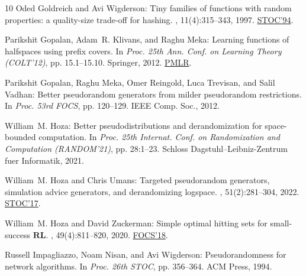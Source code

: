 \begin{thebibliography}{10}
{\sc Oded Goldreich and Avi Wigderson}: Tiny families of functions with random
  properties: a quality-size trade-off for hashing.
, 11(4):315--343, 1997.
\newblock \prelim \href{https://doi.org/10.1145/195058.195410}{STOC'94}.

{\sc Parikshit Gopalan, Adam~R. Klivans, and Raghu Meka}: Learning functions of
  halfspaces using prefix covers.
\newblock In {\em Proc. 25th Ann. Conf. on Learning Theory (COLT'12)}, pp.
  15.1--15.10. Springer, 2012.
\newblock \href{http://proceedings.mlr.press/v23/gopalan12.html}{PMLR}.

{\sc Parikshit Gopalan, Raghu Meka, Omer Reingold, Luca Trevisan, and Salil
  Vadhan}: Better pseudorandom generators from milder pseudorandom
  restrictions.
\newblock In {\em Proc. 53rd FOCS}, pp. 120--129. IEEE Comp. Soc., 2012.

{\sc William~M. Hoza}: Better pseudodistributions and derandomization for
  space-bounded computation.
\newblock In {\em Proc. 25th Internat. Conf. on Randomization and Computation
  (RANDOM'21)}, pp. 28:1--23. Schloss Dagstuhl--Leibniz-Zentrum fuer
  Informatik, 2021.

{\sc William~M. Hoza and Chris Umans}: Targeted pseudorandom generators,
  simulation advice generators, and derandomizing logspace.
, 51(2):281--304, 2022.
\newblock \prelim \href{https://doi.org/10.1145/3055399.3055414}{STOC'17}.

{\sc William~M. Hoza and David Zuckerman}: Simple optimal hitting sets for
  small-success {$\mathbf{RL}$}.
, 49(4):811--820, 2020.
\newblock \prelim \href{https://doi.org/10.1109/FOCS.2018.00015}{FOCS'18}.

{\sc Russell Impagliazzo, Noam Nisan, and Avi Wigderson}: Pseudorandomness for
  network algorithms.
\newblock In {\em Proc. 26th STOC}, pp. 356--364. ACM Press, 1994.
\newblock [\epfmtdoi{10.1145/195058.195190}]


\end{thebibliography}
